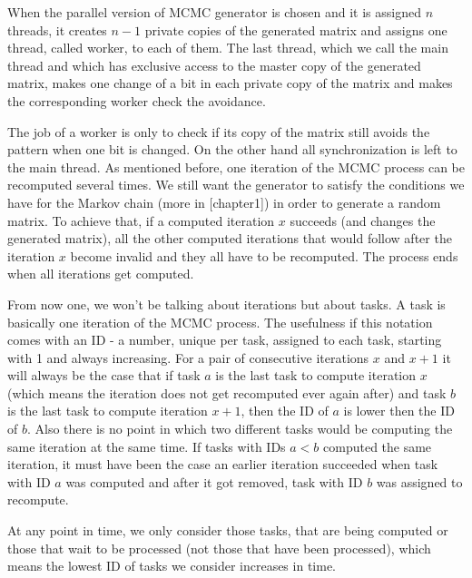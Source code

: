 When the parallel version of MCMC generator is chosen and it is assigned $n$ threads, it creates $n-1$ private copies of the generated matrix and assigns one thread, called worker, to each of them. The last thread, which we call the main thread and which has exclusive access to the master copy of the generated matrix, makes one change of a bit in each private copy of the matrix and makes the corresponding worker check the avoidance.

The job of a worker is only to check if its copy of the matrix still avoids the pattern when one bit is changed. On the other hand all synchronization is left to the main thread. As mentioned before, one iteration of the MCMC process can be recomputed several times. We still want the generator to satisfy the conditions we have for the Markov chain (more in [chapter1]) in order to generate a random matrix. To achieve that, if a computed iteration $x$ succeeds (and changes the generated matrix), all the other computed iterations that would follow after the iteration $x$ become invalid and they all have to be recomputed. The process ends when all iterations get computed.

From now one, we won't be talking about iterations but about tasks. A task is basically one iteration of the MCMC process. The usefulness if this notation comes with an ID - a number, unique per task, assigned to each task, starting with 1 and always increasing. For a pair of consecutive iterations $x$ and $x+1$ it will always be the case that if task $a$ is the last task to compute iteration $x$ (which means the iteration does not get recomputed ever again after) and task $b$ is the last task to compute iteration $x+1$, then the ID of $a$ is lower then the ID of $b$. Also there is no point in which two different tasks would be computing the same iteration at the same time. If tasks with IDs $a<b$ computed the same iteration, it must have been the case an earlier iteration succeeded when task with ID $a$ was computed and after it got removed, task with ID $b$ was assigned to recompute.

At any point in time, we only consider those tasks, that are being computed or those that wait to be processed (not those that have been processed), which means the lowest ID of tasks we consider increases in time.

